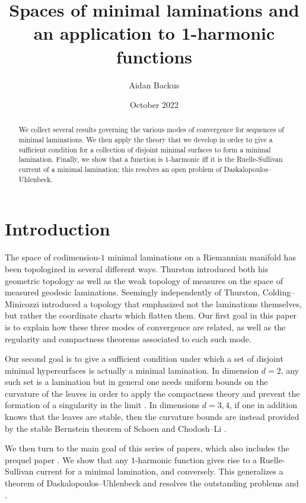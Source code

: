 \documentclass[reqno,11pt]{amsart}
\title{Spaces of minimal laminations and an application to 1-harmonic functions}
\author{Aidan Backus}
\date{October 2022}
\theoremstyle{definition}
\numberwithin{equation}{section}
\begin{document}
\begin{abstract}
We collect several results governing the various modes of convergence for sequences of minimal laminations.
We then apply the theory that we develop in order to give a sufficient condition for a collection of disjoint minimal surfaces to form a minimal lamination.
Finally, we show that a function is 1-harmonic iff it is the Ruelle-Sullivan current of a minimal lamination; this resolves an open problem of Daskalopoulos--Uhlenbeck.
\end{abstract}

\maketitle



\section{Introduction}
The space of codimension-$1$ minimal laminations on a Riemannian manifold has been topologized in several different ways.
Thurston \cite[Chapter 8]{thurston1979geometry} introduced both his geometric topology as well as the weak topology of measures on the space of measured geodesic laminations.
Seemingly independently of Thurston, Colding--Minicozzi \cite[Appendix B]{ColdingMinicozziIV} introduced a topology that emphasized not the laminations themselves, but rather the coordinate charts which flatten them.
Our first goal in this paper is to explain how these three modes of convergence are related, as well as the regularity and compactness theorems associated to each such mode.

Our second goal is to give a sufficient condition under which a set of disjoint minimal hypersurfaces is actually a minimal lamination.
In dimension $d = 2$, any such set is a lamination \cite[Proposition 7.3]{daskalopoulos2020transverse} but in general one needs uniform bounds on the curvature of the leaves in order to apply the compactness theory and prevent the formation of a singularity in the limit \cite[Lemma II.1.1]{ColdingMinicozziV}.
In dimensions $d = 3, 4$, if one in addition knows that the leaves are stable, then the curvature bounds are instead provided by the stable Bernstein theorem of Schoen \cite{Schoen2016} and Chodosh--Li \cite{Chodosh2021}.

We then turn to the main goal of this series of papers, which also includes the prequel paper \cite{BackusFLG}.
We show that any $1$-harmonic function gives rise to a Ruelle-Sullivan current for a minimal lamination, and conversely.
This generalizes a theorem of Daskalopoulos--Uhlenbeck \cite[Theorem 6.1]{daskalopoulos2020transverse} and resolves the outstanding problems \cite[Problem 9.4]{daskalopoulos2020transverse} and \cite[Conjecture 9.5]{daskalopoulos2020transverse}.
\end{document}
